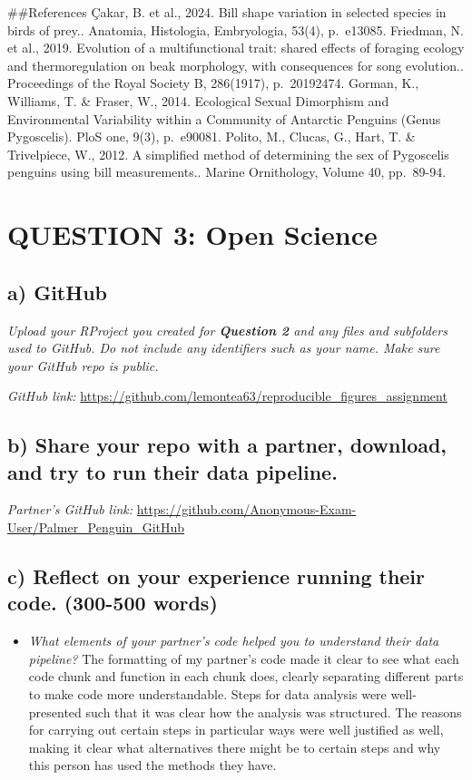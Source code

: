 \documentclass[
]{article}
\providecommand{\tightlist}{%
  \setlength{\itemsep}{0pt}\setlength{\parskip}{0pt}}
\begin{document}
\#\#References Çakar, B. et al., 2024. Bill shape variation in selected
species in birds of prey.. Anatomia, Histologia, Embryologia, 53(4),
p.~e13085. Friedman, N. et al., 2019. Evolution of a multifunctional
trait: shared effects of foraging ecology and thermoregulation on beak
morphology, with consequences for song evolution.. Proceedings of the
Royal Society B, 286(1917), p.~20192474. Gorman, K., Williams, T. \&
Fraser, W., 2014. Ecological Sexual Dimorphism and Environmental
Variability within a Community of Antarctic Penguins (Genus Pygoscelis).
PloS one, 9(3), p.~e90081. Polito, M., Clucas, G., Hart, T. \&
Trivelpiece, W., 2012. A simplified method of determining the sex of
Pygoscelis penguins using bill measurements.. Marine Ornithology, Volume
40, pp.~89-94.

\section{QUESTION 3: Open Science}\label{question-3-open-science}

\subsection{a) GitHub}\label{a-github}

\emph{Upload your RProject you created for \textbf{Question 2} and any
files and subfolders used to GitHub. Do not include any identifiers such
as your name. Make sure your GitHub repo is public.}

\emph{GitHub link:}
\url{https://github.com/lemontea63/reproducible_figures_assignment}

\subsection{b) Share your repo with a partner, download, and try to run
their data
pipeline.}\label{b-share-your-repo-with-a-partner-download-and-try-to-run-their-data-pipeline.}

\emph{Partner's GitHub link:}
\url{https://github.com/Anonymous-Exam-User/Palmer_Penguin_GitHub}

\subsection{c) Reflect on your experience running their code. (300-500
words)}\label{c-reflect-on-your-experience-running-their-code.-300-500-words}

\begin{itemize}
\tightlist
\item
  \emph{What elements of your partner's code helped you to understand
  their data pipeline?} The formatting of my partner's code made it
  clear to see what each code chunk and function in each chunk does,
  clearly separating different parts to make code more understandable.
  Steps for data analysis were well-presented such that it was clear how
  the analysis was structured. The reasons for carrying out certain
  steps in particular ways were well justified as well, making it clear
  what alternatives there might be to certain steps and why this person
  has used the methods they have.
\end{itemize}
\end{document}
